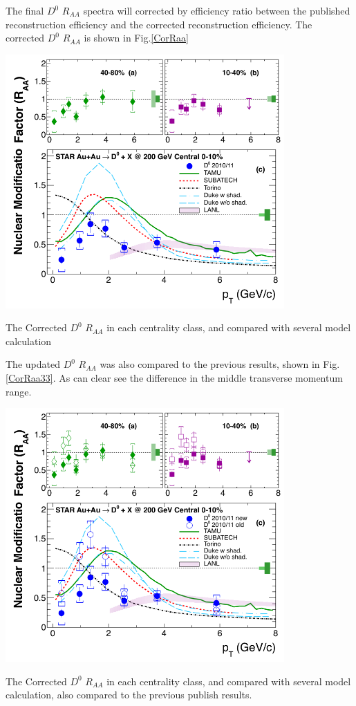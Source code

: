 

The final $D^0$ $R_{AA}$ spectra will corrected by efficiency ratio between the published reconstruction efficiency and the corrected reconstruction efficiency. The  corrected $D^0$ $R_{AA}$ is  shown in Fig.\ref{CorRaa}

\bfg \centering
\includegraphics[width=0.8\textwidth]{figure/Run11_YF/fig3.png}
\caption{The Corrected $D^0$ $R_{AA}$ in each centrality class, and compared with several model calculation }
\label{CorRaa}
\efg

The updated $D^0$ $R_{AA}$ was also compared to the previous results, shown in Fig.\ref{CorRaa33}. As can clear see the difference in the middle transverse momentum range.

\bfg \centering
\includegraphics[width=0.8\textwidth]{figure/Run11_YF/fig33.png}
\caption{The Corrected $D^0$ $R_{AA}$ in each centrality class, and compared with several model calculation, also compared to the previous publish results.}
\label{CorRaa33}
\efg

